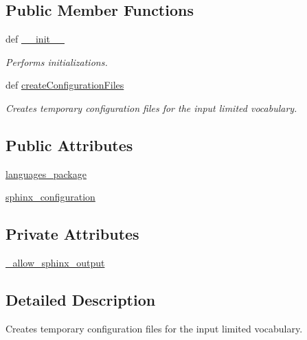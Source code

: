\subsection*{Public Member Functions}
\begin{DoxyCompactItemize}
\item 
def \hyperlink{classrapp__speech__detection__sphinx4_1_1limited__vocabulary__creator_1_1LimitedVocabularyCreator_a26ef90561284a9d51a29894801fbdbd8}{\-\_\-\-\_\-init\-\_\-\-\_\-}
\begin{DoxyCompactList}\small\item\em Performs initializations. \end{DoxyCompactList}\item 
def \hyperlink{classrapp__speech__detection__sphinx4_1_1limited__vocabulary__creator_1_1LimitedVocabularyCreator_a5ea9589816e726aca357489c2e7a1d19}{create\-Configuration\-Files}
\begin{DoxyCompactList}\small\item\em Creates temporary configuration files for the input limited vocabulary. \end{DoxyCompactList}\end{DoxyCompactItemize}
\subsection*{Public Attributes}
\begin{DoxyCompactItemize}
\item 
\hyperlink{classrapp__speech__detection__sphinx4_1_1limited__vocabulary__creator_1_1LimitedVocabularyCreator_a10de167164331a6e41fede2863f69ab0}{languages\-\_\-package}
\item 
\hyperlink{classrapp__speech__detection__sphinx4_1_1limited__vocabulary__creator_1_1LimitedVocabularyCreator_a7ddf95a2e0ec8488cf1677f8d68e0846}{sphinx\-\_\-configuration}
\end{DoxyCompactItemize}
\subsection*{Private Attributes}
\begin{DoxyCompactItemize}
\item 
\hyperlink{classrapp__speech__detection__sphinx4_1_1limited__vocabulary__creator_1_1LimitedVocabularyCreator_a931ad9f2861200ab3ef523a59eb1307f}{\-\_\-allow\-\_\-sphinx\-\_\-output}
\end{DoxyCompactItemize}


\subsection{Detailed Description}
Creates temporary configuration files for the input limited vocabulary. 

